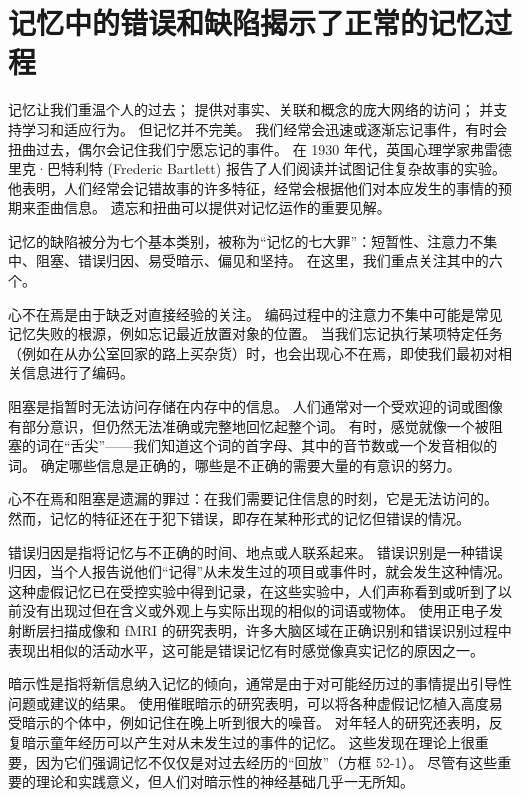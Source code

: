 \section{记忆中的错误和缺陷揭示了正常的记忆过程}

记忆让我们重温个人的过去； 提供对事实、关联和概念的庞大网络的访问； 并支持学习和适应行为。 但记忆并不完美。
我们经常会迅速或逐渐忘记事件，有时会扭曲过去，偶尔会记住我们宁愿忘记的事件。
在 1930 年代，英国心理学家弗雷德里克·巴特利特 (Frederic Bartlett) 报告了人们阅读并试图记住复杂故事的实验。
他表明，人们经常会记错故事的许多特征，经常会根据他们对本应发生的事情的预期来歪曲信息。
遗忘和扭曲可以提供对记忆运作的重要见解。


记忆的缺陷被分为七个基本类别，被称为“记忆的七大罪”：短暂性、注意力不集中、阻塞、错误归因、易受暗示、偏见和坚持。
在这里，我们重点关注其中的六个。


心不在焉是由于缺乏对直接经验的关注。
编码过程中的注意力不集中可能是常见记忆失败的根源，例如忘记最近放置对象的位置。
当我们忘记执行某项特定任务（例如在从办公室回家的路上买杂货）时，也会出现心不在焉，即使我们最初对相关信息进行了编码。


阻塞是指暂时无法访问存储在内存中的信息。
人们通常对一个受欢迎的词或图像有部分意识，但仍然无法准确或完整地回忆起整个词。
有时，感觉就像一个被阻塞的词在“舌尖”——我们知道这个词的首字母、其中的音节数或一个发音相似的词。
确定哪些信息是正确的，哪些是不正确的需要大量的有意识的努力。


心不在焉和阻塞是遗漏的罪过：在我们需要记住信息的时刻，它是无法访问的。
然而，记忆的特征还在于犯下错误，即存在某种形式的记忆但错误的情况。


错误归因是指将记忆与不正确的时间、地点或人联系起来。
错误识别是一种错误归因，当个人报告说他们“记得”从未发生过的项目或事件时，就会发生这种情况。
这种虚假记忆已在受控实验中得到记录，在这些实验中，人们声称看到或听到了以前没有出现过但在含义或外观上与实际出现的相似的词语或物体。
使用正电子发射断层扫描成像和 fMRI 的研究表明，许多大脑区域在正确识别和错误识别过程中表现出相似的活动水平，这可能是错误记忆有时感觉像真实记忆的原因之一。


暗示性是指将新信息纳入记忆的倾向，通常是由于对可能经历过的事情提出引导性问题或建议的结果。
使用催眠暗示的研究表明，可以将各种虚假记忆植入高度易受暗示的个体中，例如记住在晚上听到很大的噪音。
对年轻人的研究还表明，反复暗示童年经历可以产生对从未发生过的事件的记忆。
这些发现在理论上很重要，因为它们强调记忆不仅仅是对过去经历的“回放”（方框 52-1）。
尽管有这些重要的理论和实践意义，但人们对暗示性的神经基础几乎一无所知。



